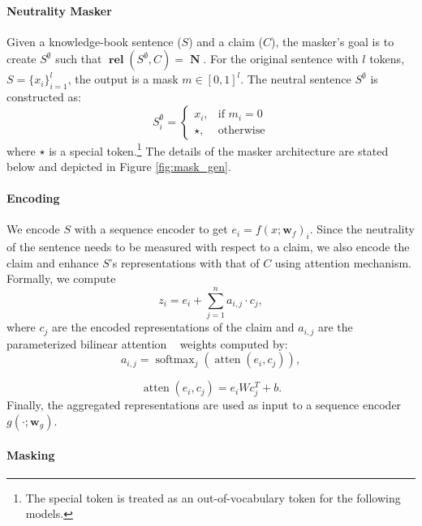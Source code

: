 \documentclass[letterpaper]{article} %
\newcommand{\figref}[1]{Figure \ref{#1}}
\DeclareMathOperator{\rel}{\boldsymbol{rel}}
\DeclareMathOperator{\atten}{atten}
\DeclareMathOperator{\softmax}{softmax}
\DeclareMathOperator{\N}{\boldsymbol{N}}
\begin{document}
\paragraph{Neutrality Masker} Given a knowledge-book sentence ($S$) and a claim ($C$), the masker's goal is to create $S^{\emptyset}$ such that $\rel(S^{\emptyset},C) = \N$. For the original sentence with $l$ tokens, $S = \{x_i\}_{i=1}^{l}$, the output is a mask $m\in[0,1]^l$. The neutral sentence $S^{\emptyset}$ is constructed as:
\begin{equation}
  {S^\emptyset_i}=\begin{cases}
    x_i, & \text{if $m_i=0$}\\
    \star, & \text{otherwise}
  \end{cases}
\end{equation}
where $\star$ is a special token.\footnote{The special token is treated as an out-of-vocabulary token for the following models.} The details of the masker architecture are stated below and depicted in \figref{fig:mask_gen}. 





\paragraph{Encoding}
We encode $S$ with a sequence encoder to get $e_i = f(x; \boldsymbol{w}_f)_i$.
Since the neutrality of the sentence needs to be measured with respect to a claim, we also encode the claim and enhance $S$'s representations with that of $C$ using attention mechanism. Formally, we compute
\begin{equation}
	z_i = e_i + \sum_{j=1}^n a_{i,j}\cdot c_j , 	
\end{equation}
where $c_j$ are the encoded representations of the claim and $a_{i,j}$ are the parameterized bilinear attention ~\cite{kim2018bilinear} weights computed by:
\begin{equation}
	a_{i,j} = \softmax_j(\atten(e_i, c_j)),
\end{equation}

\begin{equation}
	\atten(e_i, c_j) = e_i W c_j^T + b.
\end{equation}
Finally, the aggregated representations are used as input to a sequence encoder $g(\cdot; \boldsymbol{w}_g)$.


\paragraph{Masking}
\end{document}
